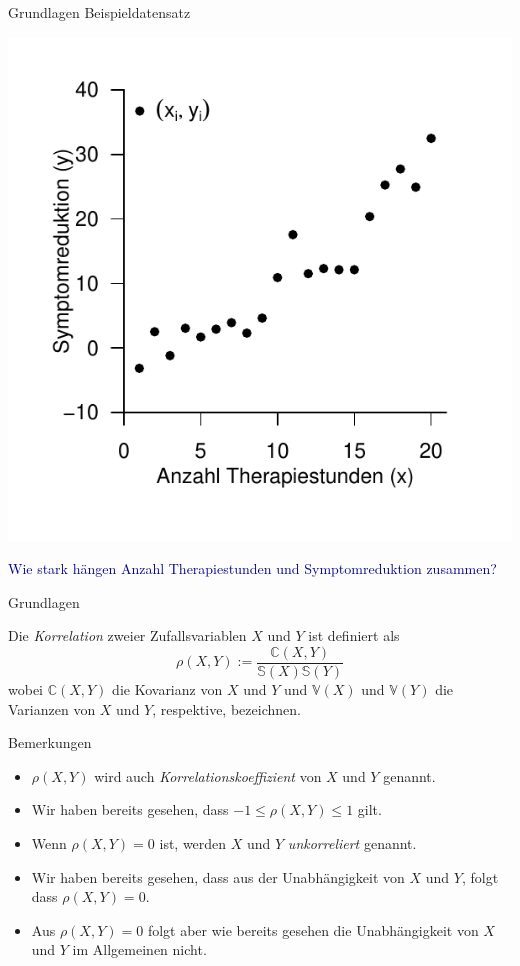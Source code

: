 \documentclass[
  8pt,
  ignorenonframetext,
]{beamer}
\providecommand{\tightlist}{%
  \setlength{\itemsep}{0pt}\setlength{\parskip}{0pt}}
\begin{document}
\begin{frame}{Grundlagen}
\protect\hypertarget{grundlagen-2}{}
Beispieldatensatz

\begin{center}\includegraphics[width=0.55\linewidth]{2_Abbildungen/alm_2_beispieldatensatz} \end{center}

\center

\textcolor{darkblue}{Wie stark hängen Anzahl Therapiestunden und Symptomreduktion zusammen?}
\end{frame}

\begin{frame}{Grundlagen}
\protect\hypertarget{grundlagen-3}{}
\small
\begin{definition}[Korrelation]
\justifying
Die \textit{Korrelation} zweier Zufallsvariablen $X$ und $Y$ ist definiert als
\begin{equation}
\rho(X,Y) := \frac{\mathbb{C}(X,Y)}{\mathbb{S}(X)\mathbb{S}(Y)}
\end{equation}
wobei $\mathbb{C}(X,Y)$ die Kovarianz von $X$ und $Y$ und $\mathbb{V}(X)$ und
$\mathbb{V}(Y)$ die Varianzen von $X$ und $Y$, respektive, bezeichnen.
\end{definition}

\footnotesize

Bemerkungen

\begin{itemize}
\tightlist
\item
  \(\rho(X,Y)\) wird auch \textit{Korrelationskoeffizient} von \(X\) und
  \(Y\) genannt.
\item
  Wir haben bereits gesehen, dass \(-1 \le \rho(X,Y) \le 1\) gilt.
\item
  Wenn \(\rho(X,Y) = 0\) ist, werden \(X\) und \(Y\)
  \textit{unkorreliert} genannt.
\item
  Wir haben bereits gesehen, dass aus der Unabhängigkeit von \(X\) und
  \(Y\), folgt dass \(\rho(X,Y) = 0\).
\item
  Aus \(\rho(X,Y) = 0\) folgt aber wie bereits gesehen die
  Unabhängigkeit von \(X\) und \(Y\) im Allgemeinen nicht.
\end{itemize}
\end{frame}
\end{document}
